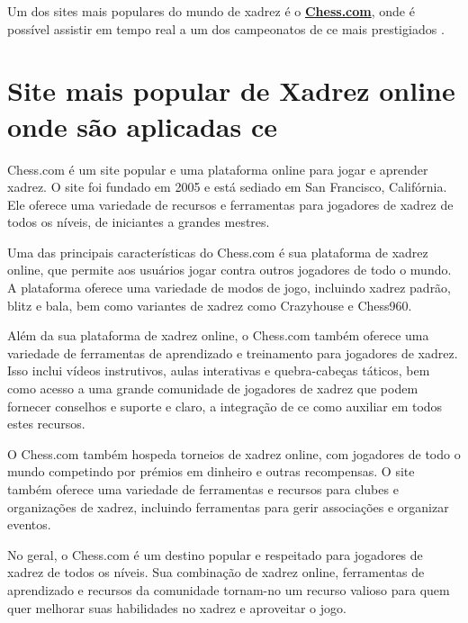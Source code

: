 \documentclass{report}
\begin{document}
Um dos sites mais populares do mundo de xadrez é o \href{http://www.chess.com}{\textbf{Chess.com}}, onde é possível assistir em tempo real a um dos campeonatos de \ac{ce} mais prestigiados \cite{chessenginechampionship}.

\section{Site mais popular de Xadrez online onde são aplicadas \ac{ce}}

Chess.com é um site popular e uma plataforma online para jogar e aprender xadrez. O site foi fundado em 2005 e está sediado em San Francisco, Califórnia. Ele oferece uma variedade de recursos e ferramentas para jogadores de xadrez de todos os níveis, de iniciantes a grandes mestres.

Uma das principais características do Chess.com é sua plataforma de xadrez online, que permite aos usuários jogar contra outros jogadores de todo o mundo. A plataforma oferece uma variedade de modos de jogo, incluindo xadrez padrão, blitz e bala, bem como variantes de xadrez como Crazyhouse e Chess960.

Além da sua plataforma de xadrez online, o Chess.com também oferece uma variedade de ferramentas de aprendizado e treinamento para jogadores de xadrez. Isso inclui vídeos instrutivos, aulas interativas e quebra-cabeças táticos, bem como acesso a uma grande comunidade de jogadores de xadrez que podem fornecer conselhos e suporte e claro, a integração de \ac{ce} como auxiliar em todos estes recursos.

O Chess.com também hospeda torneios de xadrez online, com jogadores de todo o mundo competindo por prémios em dinheiro e outras recompensas. O site também oferece uma variedade de ferramentas e recursos para clubes e organizações de xadrez, incluindo ferramentas para gerir associações e organizar eventos.

No geral, o Chess.com é um destino popular e respeitado para jogadores de xadrez de todos os níveis. Sua combinação de xadrez online, ferramentas de aprendizado e recursos da comunidade tornam-no um recurso valioso para quem quer melhorar suas habilidades no xadrez e aproveitar o jogo.
\end{document}

